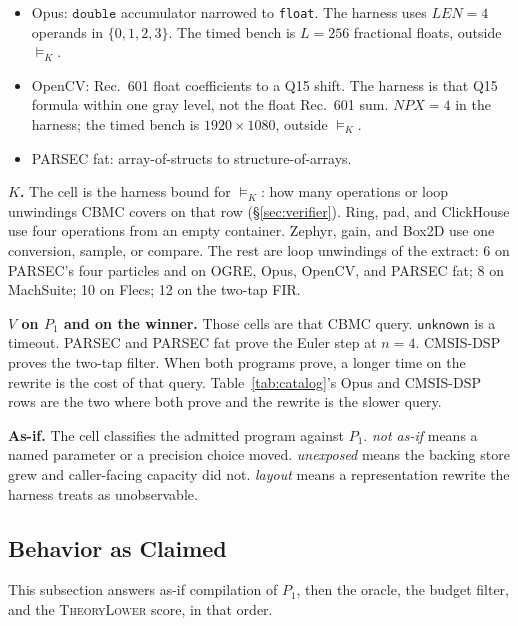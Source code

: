 \begin{itemize}
  \(\texttt{sqrtf}\) in \(P_1\) is not that test. The timed bench is
  \(10^6\) float pairs, outside \(\models_K\).
  \item Opus: \(\texttt{double}\) accumulator narrowed to \texttt{float}.
  The harness uses \(\mathit{LEN}=4\) operands in \(\{0,1,2,3\}\). The
  timed bench is \(L=256\) fractional floats, outside \(\models_K\).
  \item OpenCV: Rec.~601 float coefficients to a Q15 shift. The harness
  is that Q15 formula within one gray level, not the float Rec.~601 sum.
  \(\mathit{NPX}=4\) in the harness; the timed bench is \(1920\times 1080\),
  outside \(\models_K\).
  \item PARSEC fat: array-of-structs to structure-of-arrays.
\end{itemize}

{\bfseries\boldmath\(K\).} The cell is the harness bound for \(\models_K\): how many
operations or loop unwindings CBMC covers on that row
(\S\ref{sec:verifier}). Ring, pad, and ClickHouse use four operations from
an empty container. Zephyr, gain, and Box2D use one conversion, sample, or
compare. The rest are loop unwindings of the extract: 6 on PARSEC's four particles
and on OGRE, Opus, OpenCV, and PARSEC fat; 8 on MachSuite; 10 on Flecs;
12 on the two-tap FIR.

{\bfseries\boldmath\(V\) on \(P_1\) and on the winner.} Those cells are that CBMC
query. \(\mathsf{unknown}\) is a timeout. PARSEC and PARSEC fat prove the
Euler step at \(n=4\). CMSIS-DSP proves the two-tap filter. When both
programs prove, a longer time on the rewrite is the cost of that query.
Table~\ref{tab:catalog}'s Opus and CMSIS-DSP rows are the two where both
prove and the rewrite is the slower query.

\textbf{As-if.} The cell classifies the admitted program against \(P_1\).
\emph{not as-if} means a named parameter or a precision choice moved.
\emph{unexposed} means the backing store grew and caller-facing capacity
did not. \emph{layout} means a representation rewrite the harness treats as
unobservable.

\subsection{Behavior as Claimed}
\label{sec:microbench}

This subsection answers as-if compilation of \(P_1\), then the oracle, the
budget filter, and the \textsc{TheoryLower} score, in that order.

